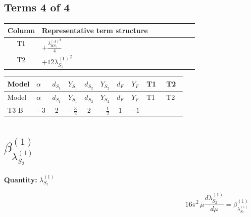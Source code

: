 \documentclass[8pt]{article}
\begin{document}
\begin{landscape}
\subsection*{Terms 4 of 4}
\begin{center}
\begin{tabular}{@{}c >{\raggedright\arraybackslash}p{0.82\linewidth}@{}}
\toprule
Column & Representative term structure \\
\midrule
T1 & \(\displaystyle +\frac{{\lambda_{HS_1}^{(A)}}^2}{4}\) \\
\midrule
T2 & \(\displaystyle +12 {\lambda_{S_1}^{(1)}}^2\) \\
\midrule
\bottomrule
\end{tabular}
\end{center}
\smallskip
\tiny
\begin{longtable}{@{}llcccccc >{\raggedright\arraybackslash}p{0.21\linewidth} >{\raggedright\arraybackslash}p{0.21\linewidth}@{}}
\toprule
Model & $\alpha$ & $d_{S_1}$ & $Y_{S_1}$ & $d_{S_2}$ & $Y_{S_2}$ & $d_F$ & $Y_F$ & T1 & T2 \\
\midrule
\endfirsthead
\toprule
Model & $\alpha$ & $d_{S_1}$ & $Y_{S_1}$ & $d_{S_2}$ & $Y_{S_2}$ & $d_F$ & $Y_F$ & T1 & T2 \\
\midrule
\endhead
T3-B & $-3$ & $2$ & $-\frac{3}{2}$ & $2$ & $-\frac{1}{2}$ & $1$ & $-1$ & \scriptsize\adjustbox{max width=\linewidth}{$\begin{gathered} +\frac{{\lambda_{HS_1}^{(A)}}^2}{4}\end{gathered}$} & \scriptsize\adjustbox{max width=\linewidth}{$\begin{gathered} +12 {\lambda_{S_1}^{(1)}}^2\end{gathered}$} \\
\midrule
\bottomrule
\end{longtable}
\clearpage
\section*{$\beta_{\lambda_{S_2}^{(1)}}^{(1)}$}
\noindent\textbf{Quantity: }$\lambda_{S_2}^{(1)}$\par\smallskip
\[16\pi^2\,\mu\frac{d \lambda_{S_2}^{(1)}}{d\mu}=\beta_{\lambda_{S_2}^{(1)}}^{(1)}\]

\end{landscape}
\end{document}
